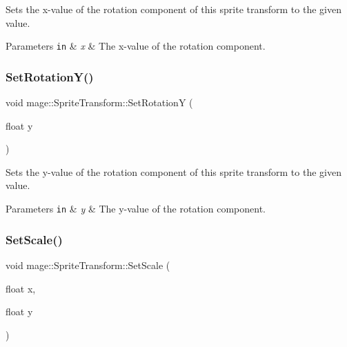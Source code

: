 Sets the x-\/value of the rotation component of this sprite transform to the given value.


\begin{DoxyParams}[1]{Parameters}
\mbox{\tt in}  & {\em x} & The x-\/value of the rotation component. \\
\hline
\end{DoxyParams}
\hypertarget{structmage_1_1_sprite_transform_a228263977bd7e96d9c5c6496aaf6116d}{}\label{structmage_1_1_sprite_transform_a228263977bd7e96d9c5c6496aaf6116d} 
\subsubsection{\texorpdfstring{Set\+Rotation\+Y()}{SetRotationY()}}
{\footnotesize\ttfamily void mage\+::\+Sprite\+Transform\+::\+Set\+RotationY (\begin{DoxyParamCaption}\item[{float}]{y }\end{DoxyParamCaption})}

Sets the y-\/value of the rotation component of this sprite transform to the given value.


\begin{DoxyParams}[1]{Parameters}
\mbox{\tt in}  & {\em y} & The y-\/value of the rotation component. \\
\hline
\end{DoxyParams}
\hypertarget{structmage_1_1_sprite_transform_abc9fdab6e961508423befabd0648dab6}{}\label{structmage_1_1_sprite_transform_abc9fdab6e961508423befabd0648dab6} 
\subsubsection{\texorpdfstring{Set\+Scale()}{SetScale()}\hspace{0.1cm}{\footnotesize\ttfamily [1/2]}}
{\footnotesize\ttfamily void mage\+::\+Sprite\+Transform\+::\+Set\+Scale (\begin{DoxyParamCaption}\item[{float}]{x,  }\item[{float}]{y }\end{DoxyParamCaption})}

